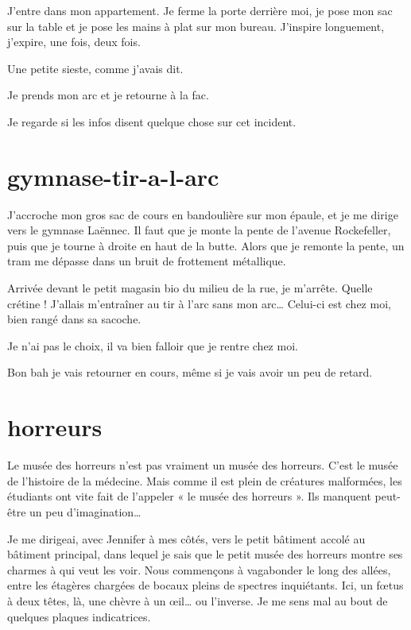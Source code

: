 J'entre dans mon appartement. Je ferme la porte derrière moi, je pose mon sac sur la table et je pose les mains à plat sur mon bureau. J'inspire longuement, j'expire, une fois, deux fois.

\item Une petite sieste, comme j'avais dit. 
\item Je prends mon arc et je retourne à la fac. 
\item Je regarde si les infos disent quelque chose sur cet incident. 
\enw

\section{gymnase-tir-a-l-arc}

J'accroche mon gros sac de cours en bandoulière sur mon épaule, et je me dirige vers le gymnase Laënnec. Il faut que je monte la pente de l'avenue Rockefeller, puis que je tourne à droite en haut de la butte. Alors que je remonte la pente, un tram me dépasse dans un bruit de frottement métallique.

Arrivée devant le petit magasin bio du milieu de la rue, je m'arrête. Quelle crétine ! J'allais m'entraîner au tir à l'arc sans mon arc… Celui-ci est chez moi, bien rangé dans sa sacoche.

\item Je n'ai pas le choix, il va bien falloir que je rentre chez moi. 
\item Bon bah je vais retourner en cours, même si je vais avoir un peu de retard. 
\enw

\section{horreurs}

Le musée des horreurs n'est pas vraiment un musée des horreurs. C'est le musée de l'histoire de la médecine. Mais comme il est plein de créatures malformées, les étudiants ont vite fait de l'appeler « le musée des horreurs ». Ils manquent peut-être un peu d'imagination…

Je me dirigeai, avec Jennifer à mes côtés, vers le petit bâtiment accolé au bâtiment principal, dans lequel je sais que le petit musée des horreurs montre ses charmes à qui veut les voir. Nous commençons à vagabonder le long des allées, entre les étagères chargées de bocaux pleins de spectres inquiétants. Ici, un fœtus à deux têtes, là, une chèvre à un œil… ou l'inverse. Je me sens mal au bout de quelques plaques indicatrices.

